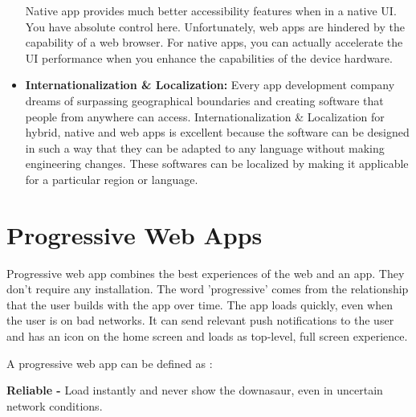\documentclass[14pt,a4paper,final]{extreport}
\begin{document}
\begin{itemize}
Native app provides much better accessibility features when in a native UI. You have absolute control here. Unfortunately, web apps are hindered by the capability of a web browser. For native apps, you can actually accelerate the UI performance when you enhance the capabilities of the device hardware.
    \item \textbf{Internationalization & Localization:}
Every app development company dreams of surpassing geographical boundaries and creating software that people from anywhere can access. Internationalization & Localization for hybrid, native and web apps is excellent because the software can be designed in such a way that they can be adapted to any language without making engineering changes. These softwares can be localized by making it applicable for a particular region or language.
\end{itemize}
\chapter{Progressive Web Apps}


\item \textbfA Progressive web app combines the best experiences of the web and an app. They don't require any installation. The word 'progressive' comes from the relationship that the user builds with the app over time. The app loads quickly, even when the user is on bad networks. It can send relevant push notifications to the user and has an icon on the home screen and loads as top-level, full screen experience.

\item A progressive web app can be defined as :

\item\textbf{Reliable -} Load instantly and never show the downasaur, even in uncertain network conditions.
\end{document}
